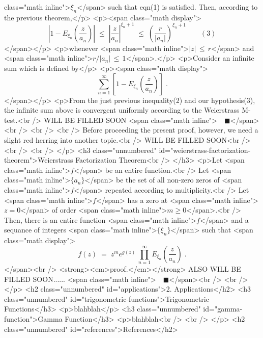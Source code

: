 class="math inline">\(\xi_n\)</span> such that eqn(1) is satisfied.
Then, according to the previous theorem,</p>
<p><span class="math display">\[\left| 1 - E_{\xi_n}
\left(\frac{z}{a_n}\right) \right| \; \le \; \left| \frac{z}{a_n}
\right|^{\xi_n + 1} \; \le \; \left( \frac{r}{|a_n|} \right)^{\xi_n + 1}
\qquad (3)\]</span></p>
<p>whenever <span class="math inline">\(|z| \,\le\, r\)</span> and <span
class="math inline">\(r/|a_n| \,\le\, 1\)</span>.</p>
<p>Consider an infinite sum which is defined by</p>
<p><span class="math display">\[\sum_{n=1}^{\infty} \left[ {1 -
E_{\xi_n} \left( \frac{z}{a_n} \right) } \right] \; .\]</span></p>
<p>From the just previous inequality(2) and our hypothesis(3), the
infinite sum above is convergent uniformly according to the Weierstrass
M-test.<br />
WILL BE FILLED SOON <span class="math inline">\(\quad
\blacksquare\)</span><br />
<br />
<br />
Before proceeding the present proof, however, we need a slight red
herring into another topic.<br />
WILL BE FILLED SOON<br />
<br />
<br />
</p>
<h3 class="unnumbered"
id="weierstrass-factorization-theorem">Weierstrass Factorization
Theorem<br />
</h3>
<p>Let <span class="math inline">\(f\)</span> be an entire
function.<br />
Let <span class="math inline">\(\{ a_n \}\)</span> be the set of all
non-zero zeros of <span class="math inline">\(f\)</span> repeated
according to multiplicity.<br />
Let <span class="math inline">\(f\)</span> has a zero at <span
class="math inline">\(z=0\)</span> of order <span
class="math inline">\(m \ge 0\)</span>.<br />
Then, there is an entire function <span class="math inline">\(f\)</span>
and a sequance of integers <span
class="math inline">\(\{\xi_n\}\)</span> such that <span
class="math display">\[f(z) \;=\; z^m e^{g(z)} \, \prod_{n=1}^{\infty}
E_{\xi_n} \left( \frac{z}{a_n} \right) \; .\]</span><br />
<strong><em>proof.</em></strong> ALSO WILL BE FILLED SOON...... <span
class="math inline">\(\quad \blacksquare\)</span><br />
<br />
</p>
<h2 class="unnumbered" id="applications">2. Applications</h2>
<h3 class="unnumbered" id="trigonometric-functions">Trigonometric
Functions</h3>
<p>blahblah</p>
<h3 class="unnumbered" id="gamma-function">Gamma Function</h3>
<p>blahblah<br />
<br />
</p>
<h2 class="unnumbered" id="references">References</h2>
